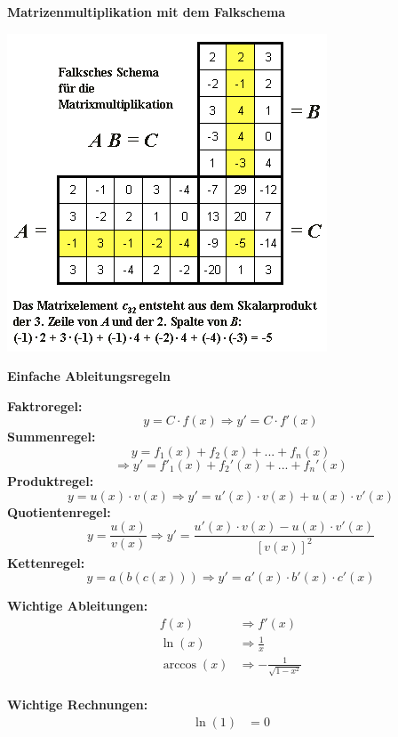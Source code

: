 \documentclass[fontset=ubuntu,12pt,a4paper,fleqn]{article}
\begin{document}
{\Large\textbf{Matrizenmultiplikation mit dem Falkschema}\par}

\setlength{\columnseprule}{0.4pt}
\begin{multicols}{2}

\includegraphics[width=0.7\linewidth]{FalkschesSchema.png}

{\Large\textbf{Einfache Ableitungsregeln}\par}

\textbf{Faktroregel:}
\[
y= C\cdot f(x) \Rightarrow y'= C\cdot f'(x)
\]
\textbf{Summenregel:}
\[
y= f_1(x) + f_2(x) + ... + f_n(x)  
\]\[
\Rightarrow y'=f'_1(x) + f_2'(x) + ... + f_n'(x)
\]
\textbf{Produktregel:}
\[
y= u(x) \cdot v(x) \Rightarrow y'=u'(x) \cdot v(x) + u(x) \cdot v'(x)
\]
\textbf{Quotientenregel:}
\[
y= \frac{u(x)}{v(x)} \Rightarrow y'=\frac{u'(x) \cdot v(x) - u(x) \cdot v'(x)}{[v(x)]^2}
\]
\textbf{Kettenregel:}
\[
y=a(b(c(x))) \Rightarrow y'= a'(x) \cdot b'(x) \cdot c'(x)
\]

\textbf{Wichtige Ableitungen:}
\begin{align*}
	f(x) &\Rightarrow f'(x)\\
	\ln(x) &\Rightarrow \frac{1}{x}\\
	\arccos(x) &\Rightarrow -\frac{1}{\sqrt{1-x^2}}\\
\end{align*}

\textbf{Wichtige Rechnungen:}
\begin{align*}
	\ln(1) &=0
\end{align*}
\newpage
\end{multicols}
\end{document}
